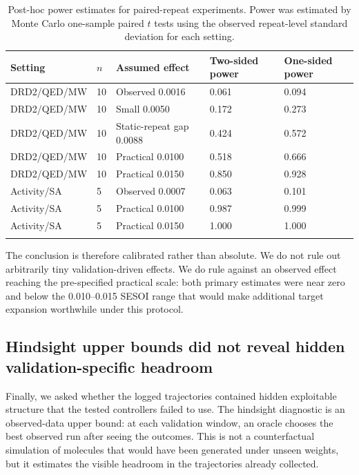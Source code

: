 \documentclass[referee,lineno,pdflatex,sn-basic]{sn-jnl}
\theoremstyle{thmstyleone}%
\theoremstyle{thmstyletwo}%
\theoremstyle{thmstylethree}%
\begin{document}
\begin{table}[h]
\caption{Post-hoc power estimates for paired-repeat experiments. Power was estimated by Monte Carlo one-sample paired $t$ tests using the observed repeat-level standard deviation for each setting.}\label{tab:power}
\small
\begin{tabular}{@{}lllll@{}}
\toprule
Setting & $n$ & Assumed effect & Two-sided power & One-sided power\\
\midrule
DRD2/QED/MW & 10 & Observed 0.0016 & 0.061 & 0.094\\
DRD2/QED/MW & 10 & Small 0.0050 & 0.172 & 0.273\\
DRD2/QED/MW & 10 & Static-repeat gap 0.0088 & 0.424 & 0.572\\
DRD2/QED/MW & 10 & Practical 0.0100 & 0.518 & 0.666\\
DRD2/QED/MW & 10 & Practical 0.0150 & 0.850 & 0.928\\
Activity/SA & 5 & Observed 0.0007 & 0.063 & 0.101\\
Activity/SA & 5 & Practical 0.0100 & 0.987 & 0.999\\
Activity/SA & 5 & Practical 0.0150 & 1.000 & 1.000\\
\botrule
\end{tabular}
\end{table}

The conclusion is therefore calibrated rather than absolute. We do not rule out arbitrarily tiny validation-driven effects. We do rule against an observed effect reaching the pre-specified practical scale: both primary estimates were near zero and below the 0.010--0.015 SESOI range that would make additional target expansion worthwhile under this protocol.

\subsection{Hindsight upper bounds did not reveal hidden validation-specific headroom}\label{subsec:hindsight}

Finally, we asked whether the logged trajectories contained hidden exploitable structure that the tested controllers failed to use. The hindsight diagnostic is an observed-data upper bound: at each validation window, an oracle chooses the best observed run after seeing the outcomes. This is not a counterfactual simulation of molecules that would have been generated under unseen weights, but it estimates the visible headroom in the trajectories already collected.
\end{document}
